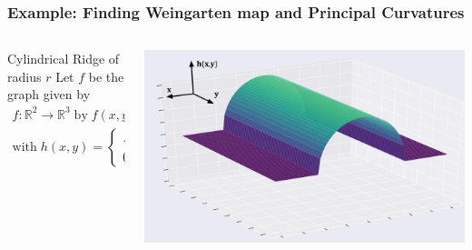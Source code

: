 \documentclass[9pt]{beamer}
\newcommand{\R}{\mathbb{R}} %
\begin{document}
\begin{frame}
  \frametitle{Example: Finding Weingarten map and Principal Curvatures}

\begin{columns}
  \begin{column}{0.5\textwidth}
    \begin{block}{Cylindrical Ridge of radius $r$}
    Let $f$ be the graph given by 
    \begin{gather*}
    f: \R^2 \to \R^3 \;\textrm{by}\; f(x,y) = (x,y,h(x,y)), \\
    \textrm{with}\;
    h(x,y) = \begin{cases}
    \sqrt{r^2 - x^2} & -r < x < r \\
    0 & \textrm{else}
    \end{cases}
    \end{gather*}
  \end{block}
  \end{column}

\begin{column}{0.5\textwidth}
  \includegraphics[width=\linewidth]{circular_trough_with_axes_flipped}
\end{column}
\end{columns}



\end{frame}
\end{document}

